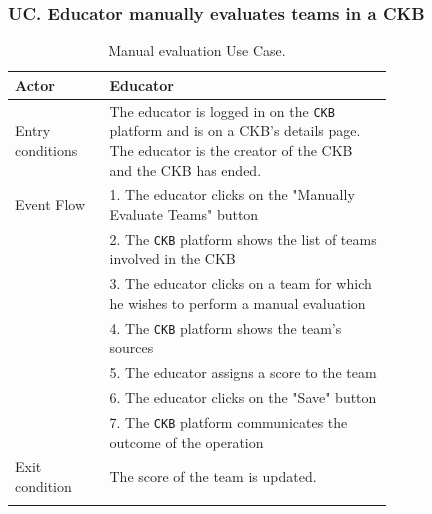 \subsubsection*{UC\cuc . Educator manually evaluates teams in a CKB}
\begin{center}
    \begin{longtable}{lp{0.75\linewidth}}
        \hline
        Actor            & Educator \\
        \hline
        Entry conditions & The educator is logged in on the \verb|CKB| platform and is on a CKB's details page. The educator is the creator of the CKB and the CKB has ended.\\
        \hline
        Event Flow      
        & 1. The educator clicks on the "Manually Evaluate Teams" button\\
        & 2. The \verb|CKB| platform shows the list of teams involved in the CKB\\
        & 3. The educator clicks on a team for which he wishes to perform a manual evaluation\\
        & 4. The \verb|CKB| platform shows the team's sources\\
        & 5. The educator assigns a score to the team\\
        & 6. The educator clicks on the "Save" button\\
        & 7. The \verb|CKB| platform communicates the outcome of the operation\\
        \hline
        Exit condition   & The score of the team is updated.   \\        
        \hline
        \caption{Manual evaluation Use Case.}
        \label{tab: manual_evaluation_use_case}
    \end{longtable}


\end{center}

